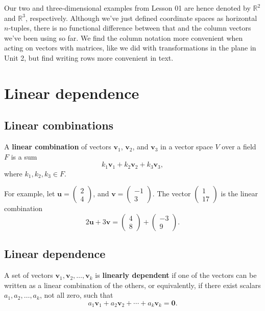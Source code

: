 \documentclass[a4paper,12pt]{amsart}
\begin{document}
    Our two and three-dimensional examples from Lesson 01 are hence denoted by $\mathbb{R}^2$ and $\mathbb{R}^3$, respectively. Although we've just defined coordinate spaces as horizontal $n$-tuples, there is no functional difference between that and the column vectors we've been using so far. We find the column notation more convenient when acting on vectors with matrices, like we did with transformations in the plane in Unit 2, but find writing rows more convenient in text.

    \section{Linear dependence}

    \subsection{Linear combinations}

    A \textbf{linear combination} of vectors $\mathbf{v}_1$, $\mathbf{v}_2$, and  $\mathbf{v}_3$ in a vector space $V$ over a field $F$ is a sum
    \[ k_1 \mathbf{v}_1 + k_2 \mathbf{v}_2 + k_3 \mathbf{v}_3, \]
    where $k_1, k_2, k_3 \in F$.

    For example, let $\mathbf{u} = \begin{pmatrix} 2 \\ 4 \end{pmatrix}$, and $\mathbf{v} = \begin{pmatrix} -1 \\ 3 \end{pmatrix}$. The vector $\begin{pmatrix} 1 \\ 17 \end{pmatrix}$ is the linear combination
    \[ 2 \mathbf{u} + 3 \mathbf{v} = \begin{pmatrix} 4 \\ 8 \end{pmatrix} + \begin{pmatrix} -3 \\ 9 \end{pmatrix}. \]
    
    \subsection{Linear dependence}
    
    A set of vectors $\mathbf{v}_1, \mathbf{v}_2, \ldots, \mathbf{v}_k$ is \textbf{linearly dependent} if one of the vectors can be written as a linear combination of the others, or equivalently, if there exist scalars $a_1, a_2, \ldots, a_k$, not all zero, such that
    \[ a_1 \mathbf{v}_1 + a_2 \mathbf{v}_2 + \cdots + a_k \mathbf{v}_k = \mathbf{0}. \]
\end{document}
